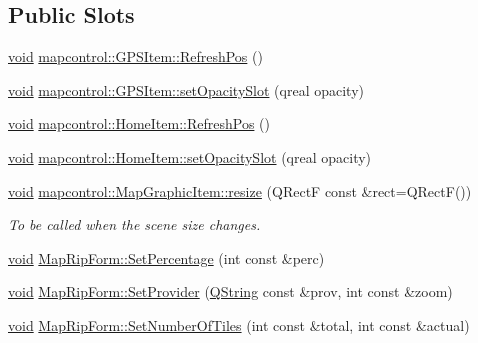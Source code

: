 \subsection*{\-Public \-Slots}
\begin{DoxyCompactItemize}
\item 
\hyperlink{group___u_a_v_objects_plugin_ga444cf2ff3f0ecbe028adce838d373f5c}{void} \hyperlink{group___o_p_map_widget_gab998fe4c6c60b16ae2caceafa1f08edc}{mapcontrol\-::\-G\-P\-S\-Item\-::\-Refresh\-Pos} ()
\item 
\hyperlink{group___u_a_v_objects_plugin_ga444cf2ff3f0ecbe028adce838d373f5c}{void} \hyperlink{group___o_p_map_widget_ga877e61b6ded2fb2da63d23538e7bb089}{mapcontrol\-::\-G\-P\-S\-Item\-::set\-Opacity\-Slot} (qreal opacity)
\item 
\hyperlink{group___u_a_v_objects_plugin_ga444cf2ff3f0ecbe028adce838d373f5c}{void} \hyperlink{group___o_p_map_widget_ga1c60e950a733d8e38796cfe092fb4154}{mapcontrol\-::\-Home\-Item\-::\-Refresh\-Pos} ()
\item 
\hyperlink{group___u_a_v_objects_plugin_ga444cf2ff3f0ecbe028adce838d373f5c}{void} \hyperlink{group___o_p_map_widget_ga47780346c1ba4c4076c12ea2555a1d8e}{mapcontrol\-::\-Home\-Item\-::set\-Opacity\-Slot} (qreal opacity)
\item 
\hyperlink{group___u_a_v_objects_plugin_ga444cf2ff3f0ecbe028adce838d373f5c}{void} \hyperlink{group___o_p_map_widget_ga717dc7dc9953d7242b9f0db9d2e3951e}{mapcontrol\-::\-Map\-Graphic\-Item\-::resize} (\-Q\-Rect\-F const \&rect=\-Q\-Rect\-F())
\begin{DoxyCompactList}\small\item\em \-To be called when the scene size changes. \end{DoxyCompactList}\item 
\hyperlink{group___u_a_v_objects_plugin_ga444cf2ff3f0ecbe028adce838d373f5c}{void} \hyperlink{group___o_p_map_widget_gae4b3b2cf5a261ca12edc1e1f092f7790}{\-Map\-Rip\-Form\-::\-Set\-Percentage} (int const \&perc)
\item 
\hyperlink{group___u_a_v_objects_plugin_ga444cf2ff3f0ecbe028adce838d373f5c}{void} \hyperlink{group___o_p_map_widget_gabf71ea1f21a81271ca9487530d7c9b23}{\-Map\-Rip\-Form\-::\-Set\-Provider} (\hyperlink{group___u_a_v_objects_plugin_gab9d252f49c333c94a72f97ce3105a32d}{\-Q\-String} const \&prov, int const \&zoom)
\item 
\hyperlink{group___u_a_v_objects_plugin_ga444cf2ff3f0ecbe028adce838d373f5c}{void} \hyperlink{group___o_p_map_widget_ga7f74961ce862f3c6173a9634b3de2e53}{\-Map\-Rip\-Form\-::\-Set\-Number\-Of\-Tiles} (int const \&total, int const \&actual)

\end{DoxyCompactItemize}
